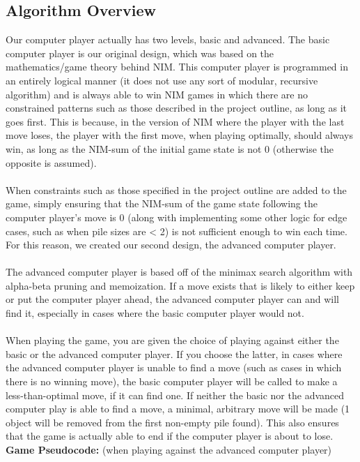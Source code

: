 \documentclass{article}
\begin{document}
\subsection*{Algorithm Overview}
Our computer player actually has two levels, basic and advanced. The basic computer player is our original design, which was based on the mathematics/game theory behind NIM. This computer player is programmed in an entirely logical manner (it does not use any sort of modular, recursive algorithm) and is always able to win NIM games in which there are no constrained patterns such as those described in the project outline, as long as it goes first. This is because, in the version of NIM where the player with the last move loses, the player with the first move, when playing optimally, should always win, as long as the NIM-sum of the initial game state is not 0 (otherwise the opposite is assumed).\\\\
When constraints such as those specified in the project outline are added to the game, simply ensuring that the NIM-sum of the game state following the computer player's move is 0 (along with implementing some other logic for edge cases, such as when pile sizes are < 2) is not sufficient enough to win each time. For this reason, we created our second design, the advanced computer player.\\\\
The advanced computer player is based off of the minimax search algorithm with alpha-beta pruning and memoization. If a move exists that is likely to either keep or put the computer player ahead, the advanced computer player can and will find it, especially in cases where the basic computer player would not.\\\\
When playing the game, you are given the choice of playing against either the basic or the advanced computer player. If you choose the latter, in cases where the advanced computer player is unable to find a move (such as cases in which there is no winning move), the basic computer player will be called to make a less-than-optimal move, if it can find one. If neither the basic nor the advanced computer play is able to find a move, a minimal, arbitrary move will be made (1 object will be removed from the first non-empty pile found). This also ensures that the game is actually able to end if the computer player is about to lose.\newpage
\textbf{Game Pseudocode:} (when playing against the advanced computer player)
\end{document}
